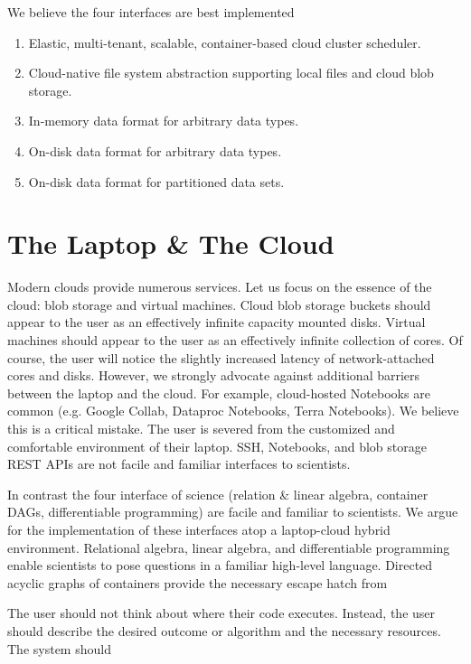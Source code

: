 \documentclass[10pt]{article}
\begin{document}
We believe the four interfaces are best implemented 

\begin{enumerate}
\item Elastic, multi-tenant, scalable, container-based cloud cluster scheduler.
\item Cloud-native file system abstraction supporting local files and cloud blob storage.
\item In-memory data format for arbitrary data types.
\item On-disk data format for arbitrary data types.
\item On-disk data format for partitioned data sets.
\end{enumerate}

\section{The Laptop \& The Cloud}

Modern clouds provide numerous services.
Let us focus on the essence of the cloud: blob storage and virtual machines.
Cloud blob storage buckets should appear to the user as an effectively infinite capacity mounted disks.
Virtual machines should appear to the user as an effectively infinite collection of cores.
Of course, the user will notice the slightly increased latency of network-attached cores and disks.
However, we strongly advocate against additional barriers between the laptop and the cloud.
For example, cloud-hosted Notebooks are common (e.g. Google Collab, Dataproc Notebooks, Terra Notebooks).
We believe this is a critical mistake.
The user is severed from the customized and comfortable environment of their laptop.
SSH, Notebooks, and blob storage REST APIs are not facile and familiar interfaces to scientists.

In contrast the four interface of science (relation \& linear algebra, container DAGs, differentiable programming) are facile and familiar to scientists.
We argue for the implementation of these interfaces atop a laptop-cloud hybrid environment.
Relational algebra, linear algebra, and differentiable programming enable scientists to pose questions in a familiar high-level language.
Directed acyclic graphs of containers provide the necessary escape hatch from 

The user should not think about where their code executes.
Instead, the user should describe the desired outcome or algorithm and the necessary resources.
The system should 
\end{document}
